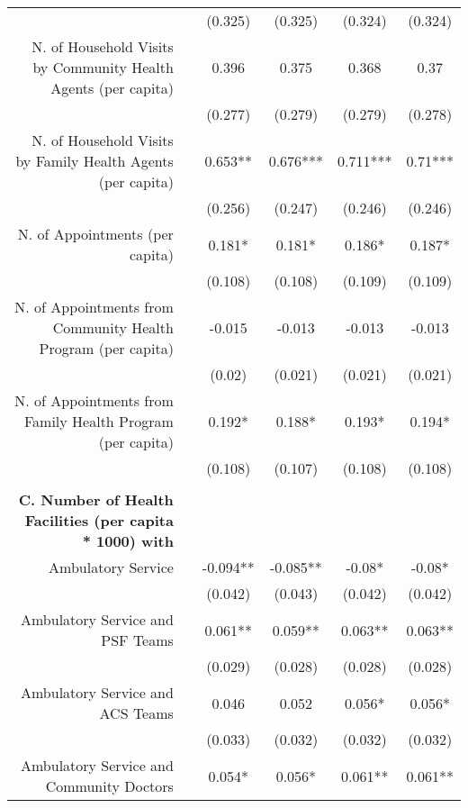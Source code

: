 \begin{table}[h!]
\begin{footnotesize}
\begin{center}
{\begin{threeparttable}[b]
\begin{tabular}{rrcccc}
          &       & (0.325) & (0.325) & (0.324) & (0.324) \\
    \multicolumn{1}{p{29.785em}}{N. of Household Visits by Community Health Agents (per capita)} &       & 0.396 & 0.375 & 0.368 & 0.37 \\
          &       & (0.277) & (0.279) & (0.279) & (0.278) \\
    \multicolumn{1}{p{29.785em}}{N. of Household Visits by Family Health Agents (per capita)} &       & 0.653** & 0.676*** & 0.711*** & 0.71*** \\
          &       & (0.256) & (0.247) & (0.246) & (0.246) \\
    \multicolumn{1}{p{29.785em}}{N. of Appointments (per capita)} &       & 0.181* & 0.181* & 0.186* & 0.187* \\
          &       & (0.108) & (0.108) & (0.109) & (0.109) \\
    \multicolumn{1}{p{29.785em}}{N. of Appointments from Community Health Program (per capita)} &       & -0.015 & -0.013 & -0.013 & -0.013 \\
          &       & (0.02) & (0.021) & (0.021) & (0.021) \\
    \multicolumn{1}{p{29.785em}}{N. of Appointments from Family Health Program (per capita)} &       & 0.192* & 0.188* & 0.193* & 0.194* \\
          &       & (0.108) & (0.107) & (0.108) & (0.108) \\
          &       &       &       &       &  \\
    \midrule
    \multicolumn{1}{p{29.785em}}{\textbf{C. Number of Health Facilities (per capita * 1000) with}} &       &       &       &       &  \\
    \multicolumn{1}{p{29.785em}}{Ambulatory Service} &       & -0.094** & -0.085** & -0.08* &  -0.08*  \\
          &       & (0.042) & (0.043) & (0.042) &  (0.042)  \\
    \multicolumn{1}{p{29.785em}}{Ambulatory Service and PSF Teams} &       & 0.061** & 0.059** & 0.063** &  0.063**  \\
          &       & (0.029) & (0.028) & (0.028) &  (0.028)  \\
    \multicolumn{1}{p{29.785em}}{Ambulatory Service and ACS Teams} &       & 0.046 & 0.052 & 0.056* &  0.056*  \\
          &       & (0.033) & (0.032) & (0.032) &  (0.032)  \\
    \multicolumn{1}{p{29.785em}}{Ambulatory Service and Community Doctors} &       & 0.054* & 0.056* & 0.061** &  0.061**  \\

\end{tabular}
\end{threeparttable}}
\end{center}
\end{footnotesize}
\end{table}
